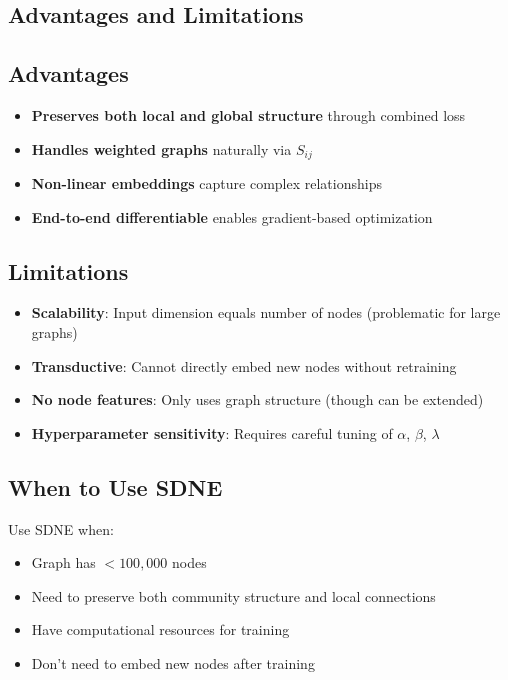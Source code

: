 \begin{notechapter}
\section{Advantages and Limitations}

\subsection{Advantages}

\begin{itemize}
    \item \textbf{Preserves both local and global structure} through combined loss
    \item \textbf{Handles weighted graphs} naturally via $S_{ij}$
    \item \textbf{Non-linear embeddings} capture complex relationships
    \item \textbf{End-to-end differentiable} enables gradient-based optimization
\end{itemize}

\subsection{Limitations}

\begin{itemize}
    \item \textbf{Scalability}: Input dimension equals number of nodes (problematic for large graphs)
    \item \textbf{Transductive}: Cannot directly embed new nodes without retraining
    \item \textbf{No node features}: Only uses graph structure (though can be extended)
    \item \textbf{Hyperparameter sensitivity}: Requires careful tuning of $\alpha$, $\beta$, $\lambda$
\end{itemize}

\subsection{When to Use SDNE}

Use SDNE when:
\begin{itemize}
    \item Graph has $<100,000$ nodes
    \item Need to preserve both community structure and local connections
    \item Have computational resources for training
    \item Don't need to embed new nodes after training
\end{itemize}


\end{notechapter}
